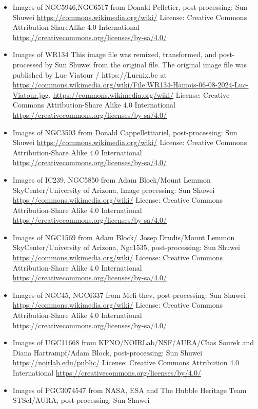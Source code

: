 \begin{itemize}
	 \url{https://ps1images.stsci.edu/cgi-bin}
	 License: Creative Commons Attribution-Share Alike 4.0 International \url{https://creativecommons.org/licenses/by-sa/4.0/} 
\item Images of NGC5946,NGC6517
	 from Donald Pelletier, post-processing: Sun Shuwei 
	 \url{https://commons.wikimedia.org/wiki/}
	 License: Creative Commons Attribution-ShareAlike 4.0 International \url{https://creativecommons.org/licenses/by-sa/4.0/} 
\item Images of WR134
	 This image file was remixed, transformed, and post-processed by Sun Shuwei from the original file. The original image file was published by Luc Viatour / https://Lucnix.be at \url{https://commons.wikimedia.org/wiki/File:WR134-Hamois-06-08-2024-Luc-Viatour.jpg}.
	 \url{https://commons.wikimedia.org/wiki/}
	 License: Creative Commons Attribution-Share Alike 4.0 International \url{https://creativecommons.org/licenses/by-sa/4.0/}
\item Images of NGC3503
	 from Donald Cappellettiariel, post-processing: Sun Shuwei
	 \url{https://commons.wikimedia.org/wiki/}
	 License: Creative Commons Attribution-Share Alike 4.0 International \url{https://creativecommons.org/licenses/by-sa/4.0/}
\item Images of IC239, NGC5850
	 from Adam Block/Mount Lemmon SkyCenter/University of Arizona, Image processing: Sun Shuwei
	 \url{https://commons.wikimedia.org/wiki/}
	 License: Creative Commons Attribution-Share Alike 4.0 International \url{https://creativecommons.org/licenses/by-sa/4.0/}
\item Images of NGC1569
	 from Adam Block/ Josep Drudis/Mount Lemmon SkyCenter/University of Arizona, Ngc1535, post-processing: Sun Shuwei
	 \url{https://commons.wikimedia.org/wiki/}
	 License: Creative Commons Attribution-Share Alike 4.0 International \url{https://creativecommons.org/licenses/by-sa/4.0/}
\item Images of NGC45, NGC6337
	 from Meli thev, post-processing: Sun Shuwei
	 \url{https://commons.wikimedia.org/wiki/}
	 License: Creative Commons Attribution-Share Alike 4.0 International \url{https://creativecommons.org/licenses/by-sa/4.0/}
\item Images of UGC11668
	 from KPNO/NOIRLab/NSF/AURA/Chas Sourek and Diana Hartrampf/Adam Block, post-processing: Sun Shuwei
	 \url{https://noirlab.edu/public/}
	 License: Creative Commons Attribution 4.0 International \url{https://creativecommons.org/licenses/by/4.0/}
\item Images of PGC3074547
	 from NASA, ESA and The Hubble Heritage Team STScI/AURA, post-processing: Sun Shuwei

\end{itemize}

